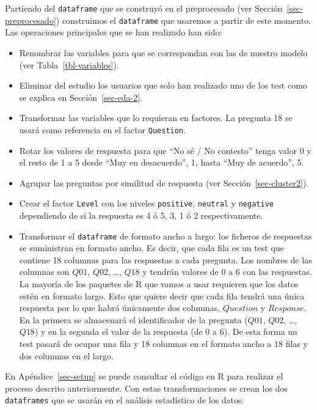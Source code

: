 \documentclass[
  12pt,
  a4paper,
  extrafontsizes,
  onecolumn,
  openright]{memoir}
\providecommand{\tightlist}{%
  \setlength{\itemsep}{0pt}\setlength{\parskip}{0pt}}\usepackage{longtable,booktabs,array}
\begin{document}
\normalsize

Partiendo del \texttt{dataframe} que se construyó en el preprocesado
(ver Sección~\ref{sec-preprocesado}) construimos el \texttt{dataframe}
que usaremos a partir de este momento. Las operaciones principales que
se han realizado han sido:

\begin{itemize}
\tightlist
\item
  Renombrar las variables para que se correspondan con las de nuestro
  modelo (ver Tabla~\ref{tbl-variables}).
\item
  Eliminar del estudio los usuarios que solo han realizado uno de los
  test como se explica en Sección~\ref{sec-eda-2}.
\item
  Transformar las variables que lo requieran en factores. La pregunta 18
  se usará como referencia en el factor \texttt{Question}.
\item
  Rotar los valores de respuesta para que \enquote{No sé / No contesto}
  tenga valor 0 y el resto de 1 a 5 desde \enquote{Muy en desacuerdo},
  1, hasta \enquote{Muy de acuerdo}, 5.
\item
  Agrupar las preguntas por similitud de respuesta (ver
  Sección~\ref{sec-cluster2}).
\item
  Crear el factor \texttt{Level} con los niveles \texttt{positive},
  \texttt{neutral} y \texttt{negative} dependiendo de si la respuesta es
  4 ó 5, 3, 1 ó 2 respectivamente.
\item
  Transformar el \texttt{dataframe} de formato ancho a largo: los
  ficheros de respuestas se suministran en formato ancho. Es decir, que
  cada fila es un test que contiene 18 columnas para las respuestas a
  cada pregunta. Los nombres de las columnas son \(Q01\), \(Q02\),
  \ldots, \(Q18\) y tendrán valores de 0 a 6 con las respuestas. La
  mayoría de los paquetes de R que vamos a usar requieren que los datos
  estén en formato largo. Esto que quiere decir que cada fila tendrá una
  única respuesta por lo que habrá únicamente dos columnas, \(Question\)
  y \(Response\). En la primera se almacenará el identificador de la
  pregunta (\(Q01\), \(Q02\), \ldots, \(Q18\)) y en la segunda el valor
  de la respuesta (de 0 a 6). De esta forma un test pasará de ocupar una
  fila y 18 columnas en el formato ancho a 18 filas y dos columnas en el
  largo.
\end{itemize}

En Apéndice~\ref{sec-setup} se puede consultar el código en R para
realizar el proceso descrito anteriormente. Con estas transformaciones
se crean los dos \texttt{dataframes} que se usarán en el análisis
estadístico de los datos:
\end{document}
